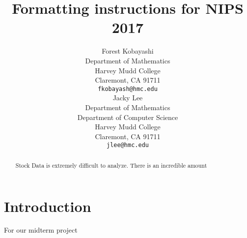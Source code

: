 \documentclass[final]{article}
\title{Formatting instructions for NIPS 2017}
\author{
  Forest Kobayashi \\
  Department of Mathematics\\
  Harvey Mudd College\\
  Claremont, CA 91711 \\
  \texttt{fkobayash@hmc.edu} \\
  \And
  Jacky Lee \\
  Department of Mathematics\\
  Department of Computer Science \\
  Harvey Mudd College \\
  Claremont, CA 91711 \\
  \texttt{jlee@hmc.edu}
}
\begin{document}

\maketitle

\begin{abstract}
  Stock Data is extremely difficult to analyze. There is an incredible
  amount
\end{abstract}

\section{Introduction}
For our midterm project
\end{document}
